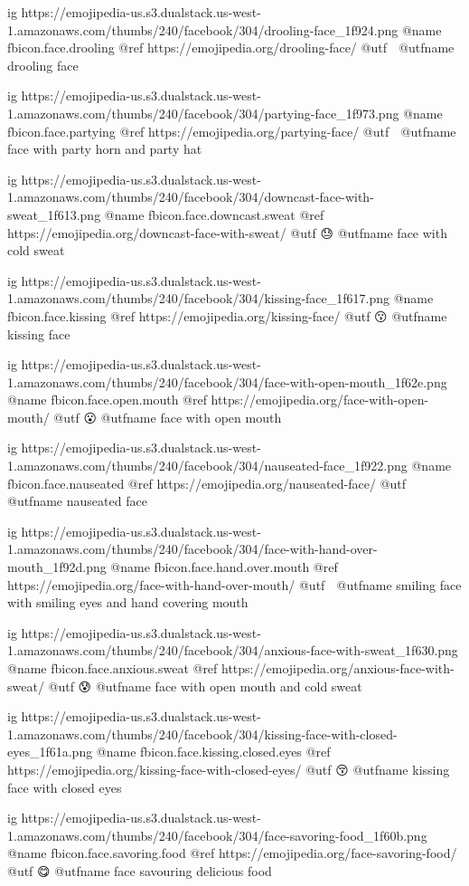 	ig https://emojipedia-us.s3.dualstack.us-west-1.amazonaws.com/thumbs/240/facebook/304/drooling-face_1f924.png
	@name fbicon.face.drooling
	@ref https://emojipedia.org/drooling-face/
	@utf 🤤
	@utfname drooling face

	ig https://emojipedia-us.s3.dualstack.us-west-1.amazonaws.com/thumbs/240/facebook/304/partying-face_1f973.png
	@name fbicon.face.partying
	@ref https://emojipedia.org/partying-face/
	@utf 🥳
	@utfname face with party horn and party hat

	ig https://emojipedia-us.s3.dualstack.us-west-1.amazonaws.com/thumbs/240/facebook/304/downcast-face-with-sweat_1f613.png
	@name fbicon.face.downcast.sweat
	@ref https://emojipedia.org/downcast-face-with-sweat/
	@utf 😓
	@utfname face with cold sweat

	ig https://emojipedia-us.s3.dualstack.us-west-1.amazonaws.com/thumbs/240/facebook/304/kissing-face_1f617.png
	@name fbicon.face.kissing
	@ref https://emojipedia.org/kissing-face/
	@utf 😗
	@utfname kissing face

	ig https://emojipedia-us.s3.dualstack.us-west-1.amazonaws.com/thumbs/240/facebook/304/face-with-open-mouth_1f62e.png
	@name fbicon.face.open.mouth
	@ref https://emojipedia.org/face-with-open-mouth/
	@utf 😮
	@utfname face with open mouth

	ig https://emojipedia-us.s3.dualstack.us-west-1.amazonaws.com/thumbs/240/facebook/304/nauseated-face_1f922.png
	@name fbicon.face.nauseated
	@ref https://emojipedia.org/nauseated-face/
	@utf 🤢
	@utfname nauseated face

	ig https://emojipedia-us.s3.dualstack.us-west-1.amazonaws.com/thumbs/240/facebook/304/face-with-hand-over-mouth_1f92d.png
	@name fbicon.face.hand.over.mouth
	@ref https://emojipedia.org/face-with-hand-over-mouth/
	@utf 🤭
	@utfname smiling face with smiling eyes and hand covering mouth

	ig https://emojipedia-us.s3.dualstack.us-west-1.amazonaws.com/thumbs/240/facebook/304/anxious-face-with-sweat_1f630.png
	@name fbicon.face.anxious.sweat
	@ref https://emojipedia.org/anxious-face-with-sweat/
	@utf 😰
	@utfname face with open mouth and cold sweat

	ig https://emojipedia-us.s3.dualstack.us-west-1.amazonaws.com/thumbs/240/facebook/304/kissing-face-with-closed-eyes_1f61a.png
	@name fbicon.face.kissing.closed.eyes
	@ref https://emojipedia.org/kissing-face-with-closed-eyes/
	@utf 😚
	@utfname kissing face with closed eyes

	ig https://emojipedia-us.s3.dualstack.us-west-1.amazonaws.com/thumbs/240/facebook/304/face-savoring-food_1f60b.png
	@name fbicon.face.savoring.food
	@ref https://emojipedia.org/face-savoring-food/
	@utf 😋
	@utfname face savouring delicious food

